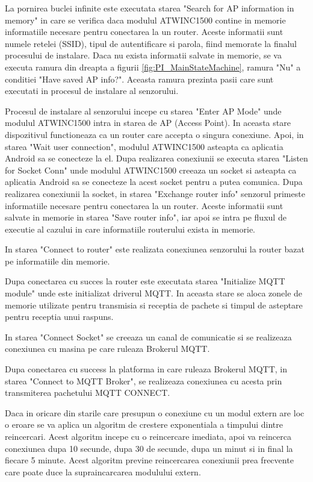 La pornirea buclei infinite este executata starea "Search for AP information in memory" in care se verifica daca modulul ATWINC1500 contine in memorie informatiile 
necesare pentru conectarea la un router. Aceste informatii sunt numele retelei (SSID), tipul de autentificare si parola, fiind memorate la finalul procesului de instalare. 
Daca nu exista informatii salvate in memorie, se va executa ramura din dreapta a figurii \ref{fig:PI_MainStateMachine}, ramura "Nu" a conditiei "Have saved AP info?". 
Aceasta ramura prezinta pasii care sunt executati in procesul de instalare al senzorului.

Procesul de instalare al senzorului incepe cu starea "Enter AP Mode" unde modulul ATWINC1500 intra in starea de AP (Access Point). In aceasta stare dispozitivul 
functioneaza ca un router care accepta o singura conexiune. Apoi, in starea "Wait user connection", modulul ATWINC1500 asteapta ca aplicatia Android sa se conecteze 
la el. Dupa realizarea conexiunii se executa starea "Listen for Socket Conn" unde modulul ATWINC1500 creeaza un socket si asteapta ca aplicatia Android sa se conecteze 
la acest socket pentru a putea comunica. Dupa realizarea conexiunii la socket, in starea "Exchange router info" senzorul primeste informatiile necesare pentru conectarea 
la un router. Aceste informatii sunt salvate in memorie in starea "Save router info", iar apoi se intra pe fluxul de executie al cazului in care informatiile routerului 
exista in memorie.

In starea "Connect to router" este realizata conexiunea senzorului la router bazat pe informatiile din memorie. 

Dupa conectarea cu succes la router este executata starea "Initialize MQTT module" unde este initializat driverul MQTT. In aceasta stare se aloca zonele de memorie 
utilizate pentru transmisia si receptia de pachete si timpul de asteptare pentru receptia unui raspuns.

In starea "Connect Socket" se creeaza un canal de comunicatie si se realizeaza conexiunea cu masina pe care ruleaza Brokerul MQTT.

Dupa conectarea cu success la platforma in care ruleaza Brokerul MQTT, in starea "Connect to MQTT Broker", se realizeaza conexiunea cu acesta prin transmiterea 
pachetului MQTT CONNECT.

Daca in oricare din starile care presupun o conexiune cu un modul extern are loc o eroare se va aplica un algoritm de crestere exponentiala a timpului dintre 
reincercari. Acest algoritm incepe cu o reincercare imediata, apoi va reincerca conexiunea dupa 10 secunde, dupa 30 de secunde, dupa un minut si in final la fiecare 
5 minute. Acest algoritm previne reincercarea conexiunii prea frecvente care poate duce la supraincarcarea modulului extern.

